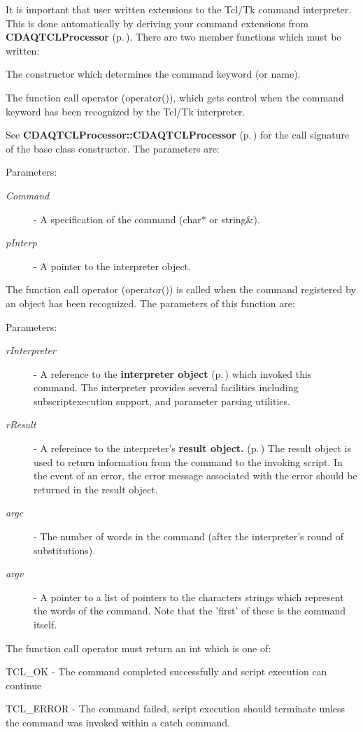 It is important that user written extensions to the Tcl/Tk command interpreter. This is done automatically by deriving your command extensions from  {\bf CDAQTCLProcessor} {\rm (p.\,\pageref{classCDAQTCLProcessor})}. There are two member functions which must be written:\begin{CompactItemize}
\item 
The constructor which determines the command keyword (or name).\item 
The function call operator (operator()), which gets control when the  command keyword has been recognized by the Tcl/Tk interpreter.\end{CompactItemize}
See {\bf CDAQTCLProcessor::CDAQTCLProcessor} {\rm (p.\,\pageref{classCDAQTCLProcessor_a0})} for the call signature of the base class constructor. The parameters are: \begin{Desc}
\item[Parameters: ]\par
\begin{description}
\item[{\em 
Command}]- A specification of the command (char$\ast$ or string\&). \item[{\em 
p\-Interp}]- A pointer to the interpreter object.\end{description}
\end{Desc}
The function call operator (operator()) is called when the command  registered by an object has been recognized. The parameters of this function are: \begin{Desc}
\item[Parameters: ]\par
\begin{description}
\item[{\em 
r\-Interpreter}]- A reference to the {\bf interpreter  	object} {\rm (p.\,\pageref{classCTCLInterpreter})} which invoked this command. The interpreter provides several facilities including subscriptexecution support, and parameter parsing utilities. \item[{\em 
r\-Result}]- A refereince to the interpreter's {\bf result 	object.} {\rm (p.\,\pageref{classCTCLResult})} The result object is used to return information from the command to the invoking script. In the event of an error, the error message associated with the error should be returned in the result object. \item[{\em 
argc}]- The number of words in the command (after the interpreter's round of substitutions). \item[{\em 
argv}]- A pointer to a list of pointers to the characters strings which represent the words of the command. Note that the 'first' of these is the command itself.\end{description}
\end{Desc}
The function call operator must return an int which is one of:\begin{CompactItemize}
\item 
TCL\_\-OK - The command completed successfully and script execution can continue\item 
TCL\_\-ERROR - The command failed, script execution should terminate unless the command was invoked within a catch command.\end{CompactItemize}
